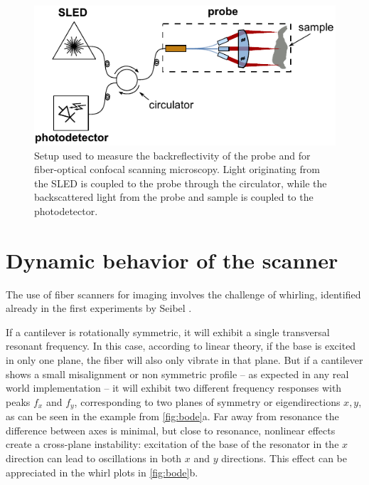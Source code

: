 \begin{itemize}
\end{itemize}

\begin{figure}[h!]\centering \includegraphics[width=12cm]{figures/50_Measurements/conf/setup/confSetup.pdf}
      \caption{Setup used to measure the backreflectivity of the probe and for fiber-optical confocal scanning microscopy. Light originating from the SLED is coupled to the probe through the circulator, while the backscattered light from the probe and sample is coupled to the photodetector.}
      \label{fig:confSetup}
\end{figure}

\section{Dynamic behavior of the scanner}

The use of fiber scanners for imaging involves the challenge of whirling, identified already in the first experiments by Seibel \cite{Seibel2001}.

If a cantilever is rotationally symmetric, it will exhibit a single transversal resonant frequency. In this case, according to linear theory, if the base is excited in only one plane, the fiber will also only vibrate in that plane. But if a cantilever shows a small misalignment or non symmetric profile -- as expected in any real world implementation -- it will exhibit two different frequency responses with peaks $f_x$ and $f_y$, corresponding to two planes of symmetry or eigendirections $x,y$, as can be seen in the example from \autoref{fig:bode}a. Far away from resonance the difference between axes is minimal, but close to resonance, nonlinear effects create a cross-plane instability: excitation of the base of the resonator in the $x$ direction can lead to oscillations in both $x$ and $y$ directions. This effect can be appreciated in the whirl plots in  \autoref{fig:bode}b. 

